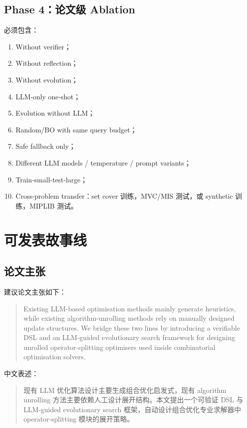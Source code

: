 \documentclass[12pt,a4paper]{ctexart}
\begin{document}
\subsection{Phase 4：论文级 Ablation}
必须包含：
\begin{enumerate}
    \item Without verifier；
    \item Without reflection；
    \item Without evolution；
    \item LLM-only one-shot；
    \item Evolution without LLM；
    \item Random/BO with same query budget；
    \item Safe fallback only；
    \item Different LLM models / temperature / prompt variants；
    \item Train-small-test-large；
    \item Cross-problem transfer：set cover 训练，MVC/MIS 测试，或 synthetic 训练，MIPLIB 测试。
\end{enumerate}

\section{可发表故事线}

\subsection{论文主张}
建议论文主张如下：
\begin{quote}
Existing LLM-based optimisation methods mainly generate heuristics, while existing algorithm-unrolling methods rely on manually designed update structures. We bridge these two lines by introducing a verifiable DSL and an LLM-guided evolutionary search framework for designing unrolled operator-splitting optimisers used inside combinatorial optimisation solvers.
\end{quote}

中文表述：
\begin{quote}
现有 LLM 优化算法设计主要生成组合优化启发式，现有 algorithm unrolling 方法主要依赖人工设计展开结构。本文提出一个可验证 DSL 与 LLM-guided evolutionary search 框架，自动设计组合优化专业求解器中 operator-splitting 模块的展开策略。
\end{quote}
\end{document}
